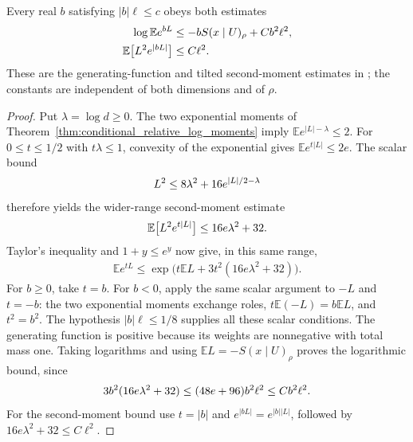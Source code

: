 \begin{theorem}
    \label{thm:conditional_relative_log_mgf}
    \leanok
    Every real $b$ satisfying $|b|\ell\le c$ obeys both estimates
    \begin{align}
        \log\mathbb E e^{bL}
        &\le-bS(x\mid U)_\rho+Cb^2\ell^2,\notag\\
        \mathbb E\bigl[L^2e^{|bL|}\bigr]&\le C\ell^2.\notag
    \end{align}
    These are the generating-function and tilted second-moment estimates in
    \cite[Section~5.1]{OpenAI2026AreaLaw}; the constants are independent of
    both dimensions and of $\rho$.
\end{theorem}
\begin{proof}\leanok
    Put $\lambda=\log d\ge0$. The two exponential moments of
    Theorem~\ref{thm:conditional_relative_log_moments} imply
    $\mathbb E e^{|L|-\lambda}\le2$.
    For $0\le t\le1/2$ with $t\lambda\le1$, convexity of the exponential
    gives $\mathbb E e^{t|L|}\le2e$. The scalar bound
    \begin{align}
        L^2\le8\lambda^2+16e^{|L|/2-\lambda}\notag
    \end{align}
    therefore yields the wider-range second-moment estimate
    \begin{align}
        \mathbb E\bigl[L^2e^{t|L|}\bigr]
        \le16e\lambda^2+32.\notag
    \end{align}
    Taylor's inequality and $1+y\le e^y$ now give, in this same range,
    \begin{align}
        \mathbb E e^{tL}
        \le\exp\!\bigl(t\mathbb E L
            +3t^2(16e\lambda^2+32)\bigr).
        \label{eq:conditional_log_raw_mgf}
    \end{align}
    For $b\ge0$, take $t=b$. For $b<0$, apply the same scalar argument
    to $-L$ and $t=-b$: the two exponential moments exchange roles,
    $t\mathbb E(-L)=b\mathbb E L$, and $t^2=b^2$.
    The hypothesis $|b|\ell\le1/8$ supplies all these scalar conditions.
    The generating function is positive because its weights are nonnegative
    with total mass one. Taking logarithms and using
    $\mathbb E L=-S(x\mid U)_\rho$ proves the logarithmic bound, since
    \begin{align}
        3b^2(16e\lambda^2+32)
        \le(48e+96)b^2\ell^2\le Cb^2\ell^2.\notag
    \end{align}
    For the second-moment bound use $t=|b|$ and
    $e^{|bL|}=e^{|b||L|}$, followed by
    $16e\lambda^2+32\le C\ell^2$.
\end{proof}

